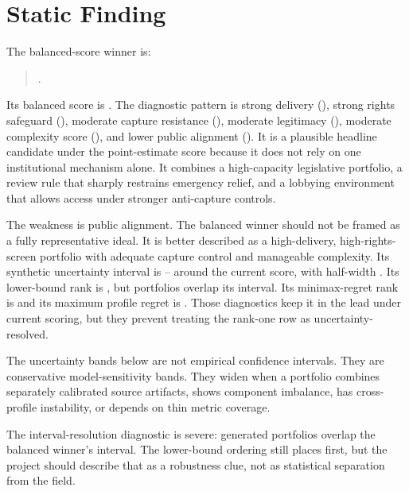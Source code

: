 \documentclass[11pt]{article}
\providecommand{\GeneratedDir}{generated}
\begin{document}
\section{Static Finding}

The balanced-score winner is:

\begin{quote}
\BalancedWinnerName.
\end{quote}



Its balanced score is \BalancedWinnerScore. The diagnostic pattern is strong delivery (\BalancedWinnerDelivery), strong rights safeguard (\BalancedWinnerRightsSafeguard), moderate capture resistance (\BalancedWinnerCaptureResistance), moderate legitimacy (\BalancedWinnerLegitimacy), moderate complexity score (\BalancedWinnerComplexity), and lower public alignment (\BalancedWinnerPublicAlignment). It is a plausible headline candidate under the point-estimate score because it does not rely on one institutional mechanism alone. It combines a high-capacity legislative portfolio, a review rule that sharply restrains emergency relief, and a lobbying environment that allows access under stronger anti-capture controls.

The weakness is public alignment. The balanced winner should not be framed as a fully representative ideal. It is better described as a high-delivery, high-rights-screen portfolio with adequate capture control and manageable complexity. Its synthetic uncertainty interval is \BalancedWinnerUncertaintyLow--\BalancedWinnerUncertaintyHigh{} around the current score, with half-width \BalancedWinnerUncertaintyBand. Its lower-bound rank is \BalancedUncertaintyLowerBoundRank{}, but \BalancedUncertaintyOverlapCount{} portfolios overlap its interval. Its minimax-regret rank is \BalancedWinnerMinimaxRegretRank{} and its maximum profile regret is \BalancedWinnerMaxProfileRegret. Those diagnostics keep it in the lead under current scoring, but they prevent treating the rank-one row as uncertainty-resolved.

The uncertainty bands below are not empirical confidence intervals. They are conservative model-sensitivity bands. They widen when a portfolio combines separately calibrated source artifacts, shows component imbalance, has cross-profile instability, or depends on thin metric coverage.



The interval-resolution diagnostic is severe: \BalancedUncertaintyOverlapCount{} generated portfolios overlap the balanced winner's interval. The lower-bound ordering still places \UncertaintyLowerBoundWinnerName{} first, but the project should describe that as a robustness clue, not as statistical separation from the field.
\end{document}
